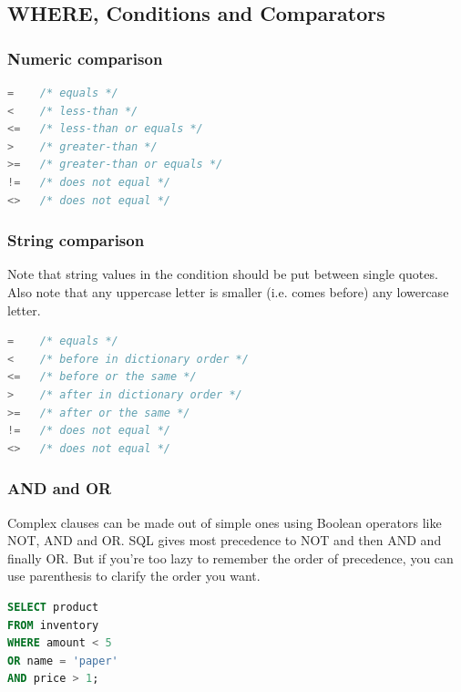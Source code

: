 \documentclass{article}
\begin{document}
\subsection{WHERE, Conditions and Comparators}
\subsubsection{Numeric comparison}

\vspace{8pt} \begin{lstlisting}[language=SQL]
=    /* equals */
<    /* less-than */
<=   /* less-than or equals */
>    /* greater-than */
>=   /* greater-than or equals */
!=   /* does not equal */
<>   /* does not equal */
\end{lstlisting} \vspace{8pt}

\subsubsection{String comparison}

Note that string values in the condition should be put between single quotes. Also note that any uppercase letter is smaller (i.e. comes before) any lowercase letter.

\vspace{8pt} \begin{lstlisting}[language=SQL]
=    /* equals */
<    /* before in dictionary order */
<=   /* before or the same */
>    /* after in dictionary order */
>=   /* after or the same */
!=   /* does not equal */
<>   /* does not equal */ 
\end{lstlisting} \vspace{8pt}

\subsubsection{AND and OR}

Complex clauses can be made out of simple ones using Boolean operators like NOT, AND and OR. SQL gives most precedence to NOT and then AND and finally OR. But if you’re too lazy to remember the order of precedence, you can use parenthesis to clarify the order you want.

\vspace{8pt} \begin{lstlisting}[language=SQL]
SELECT product
FROM inventory
WHERE amount < 5
OR name = 'paper'
AND price > 1;
\end{lstlisting} \vspace{8pt}
\end{document}
